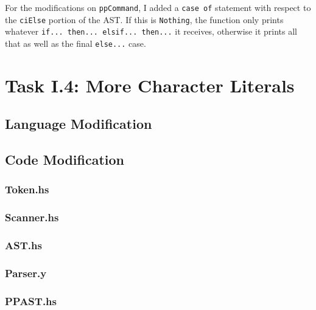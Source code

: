 \documentclass[12pt]{article}
\newcommand{\lstin}[3]{%
  
}
\begin{document}
For the modifications on \verb|ppCommand|, I added a \verb|case of| statement with respect to the \verb|ciElse| portion of the AST. 
If this is \verb|Nothing|, the function only prints whatever \verb|if... then... elsif... then...| it receives, otherwise it prints all that as well as the final \verb|else...| case.

\lstin{54}{61}{PPAST.hs}

\section{Task I.4: More Character Literals}
\subsection{Language Modification}

\subsection{Code Modification}
\subsubsection{Token.hs}
\subsubsection{Scanner.hs}
\subsubsection{AST.hs}
\subsubsection{Parser.y}
\subsubsection{PPAST.hs}
\end{document}
